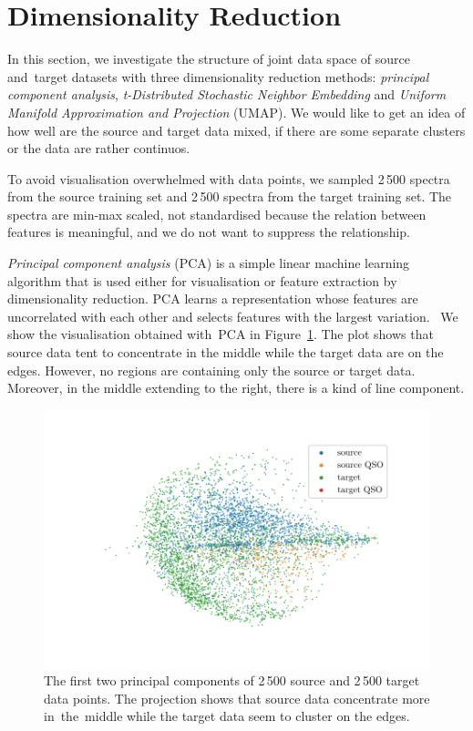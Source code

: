 \section{Dimensionality Reduction}

In this section, we investigate the structure of joint data space of source and~target datasets with three dimensionality reduction methods:
\textit{principal component analysis},
\textit{t-Distributed Stochastic Neighbor Embedding}
and \textit{Uniform Manifold Approximation and Projection} (UMAP).
We would like to get an idea of how well are the source and target data mixed,
if there are some separate clusters or the data are rather continuos.

To avoid visualisation overwhelmed with data points,
we sampled 2\,500 spectra from the source training set
and 2\,500 spectra from the target training set.
The spectra are min-max scaled, not standardised
because the relation between features is meaningful,
and we do not want to suppress the relationship.

\textit{Principal component analysis} (PCA) is a simple linear machine learning algorithm
that is used either for visualisation or feature extraction by dimensionality reduction.
PCA learns a representation whose features are uncorrelated with each other
and selects features with the largest variation.~\cite{goodfellow2016}
We show the visualisation obtained with~PCA in Figure~\ref{pca}.
The plot shows that source data tent to concentrate in the middle
while the target data are on the edges.
However, no regions are containing only the source or target data.
Moreover, in the middle extending to the right, there is a kind of line component.

\begin{figure}
\includegraphics[width=\textwidth]{img/pca.pdf}
\caption[PCA visualisation of source and target data distributions]{
	The first two principal components of 2\,500 source
	and 2\,500 target data points.
	The projection shows that source data concentrate more in~the~middle
	while the target data seem to cluster on the edges.
	}
\label{pca}
\end{figure}

